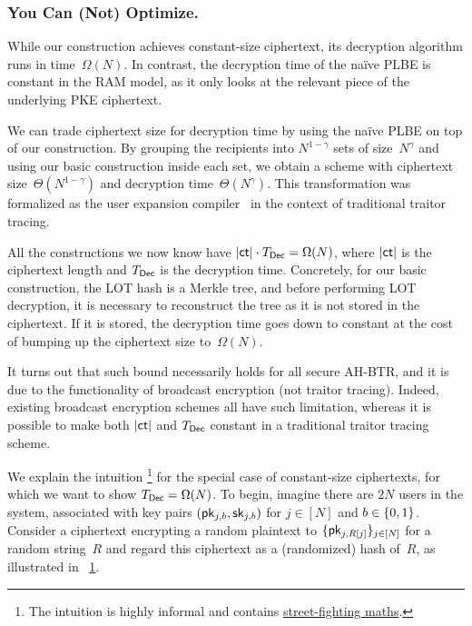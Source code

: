 \subsubsection{You Can (Not) Optimize.}
While our construction achieves constant-size ciphertext,
its decryption algorithm runs in time~$\Omega(N)$.
In contrast, the decryption time of the na{\"i}ve PLBE is constant in the RAM model, as it only looks at the relevant piece of the underlying PKE ciphertext.

We can trade ciphertext size for decryption time by using the na{\"i}ve PLBE on top of our construction.
By grouping the recipients into $N^{1-\gamma}$ sets of size~$N^\gamma$ and using our basic construction inside each set, we obtain a scheme with ciphertext size~$\Theta(N^{1-\gamma})$ and decryption time~$\Theta(N^\gamma)$.
This transformation was formalized as the user expansion compiler~\cite{C:Zhandry20} in the context of traditional traitor tracing.

All the constructions we now know have ${|\ct|\cdot\TDec=\Omega(N)}$,
where $|\ct|$ is the ciphertext length and $\TDec$ is the decryption time.
Concretely, for our basic construction, the LOT hash is a Merkle tree, and before performing LOT decryption, it is necessary to reconstruct the tree as it is not stored in the ciphertext.
If it is stored, the decryption time goes down to constant at the cost of bumping up the ciphertext size to~$\Omega(N)$.

It turns out that such bound necessarily holds for all secure AH-BTR, and
it is due to the functionality of broadcast encryption (not traitor tracing).
Indeed, existing broadcast encryption schemes all have such limitation, whereas
it is possible to make both $|\ct|$ and $\TDec$ constant in a traditional traitor tracing scheme.

We explain the intuition%
\footnote{The intuition is highly informal and contains \href{https://twitter.com/booleananalysis/status/1219821061430300676}{street-fighting maths}.}
for the special case of constant-size ciphertexts, for which we want to show ${\TDec=\Omega(N)}$.
To begin, imagine there are $2N$ users in the system, associated with key pairs $(\pk_{j,b},\sk_{j,b})$ for ${j\in[N]}$ and ${b\in{\{0,1\}}}$.
Consider a ciphertext encrypting a random plaintext to $\{\pk_{j,R[j]}\}_{j\in[N]}$ for a random string~$R$ and
regard this ciphertext as a (randomized) hash of~$R$, as illustrated in \Figure~\ref{fig:lower-bound}.

\begin{figure}

\label{fig:lower-bound}
\end{figure}

